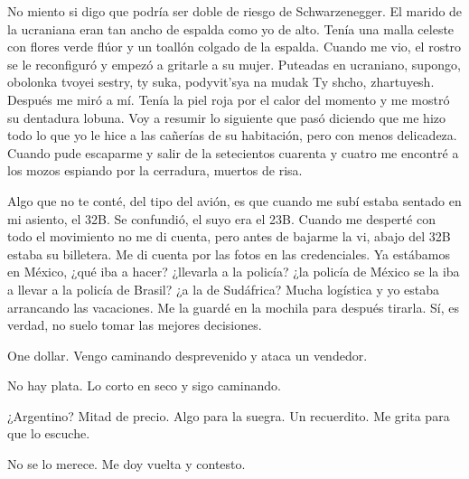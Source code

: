 \documentclass[12pt,twoside,openright,a5paper]{book}
\begin{document}
No miento si digo que podría ser doble de riesgo de Schwarzenegger. El
marido de la ucraniana eran tan ancho de espalda como yo de alto. Tenía
una malla celeste con flores verde flúor y un toallón colgado de la
espalda. Cuando me vio, el rostro se le reconfiguró y empezó a gritarle a
su mujer. Puteadas en ucraniano, supongo, obolonka tvoyei sestry, ty suka,
podyvit'sya na mudak Ty shcho, zhartuyesh. Después me miró a mí. Tenía
la piel roja por el calor del momento y me mostró su dentadura lobuna. Voy
a resumir lo siguiente que pasó diciendo que me hizo todo lo que yo le
hice a las cañerías de su habitación, pero con menos delicadeza. Cuando
pude escaparme y salir de la setecientos cuarenta y cuatro me encontré a
los mozos espiando por la cerradura, muertos de risa.

\vspace{0.5cm}

\hrulefill\hspace{0.2cm} \decofourleft\decofourright \hspace{0.2cm} \hrulefill
\vspace{0.5cm}

Algo que no te conté, del tipo del avión, es que cuando me subí estaba
sentado en mi asiento, el 32B. Se confundió, el suyo era el 23B. Cuando
me desperté con todo el movimiento no me di cuenta, pero antes de bajarme
la vi, abajo del 32B estaba su billetera. Me di cuenta por las fotos en
las credenciales. Ya estábamos en México, ¿qué iba a hacer? ¿llevarla
a la policía? ¿la policía de México se la iba a llevar a la policía
de Brasil? ¿a la de Sudáfrica? Mucha logística y yo estaba arrancando
las vacaciones. Me la guardé en la mochila para después tirarla. Sí,
es verdad, no suelo tomar las mejores decisiones.

\vspace{0.5cm}

\hrulefill\hspace{0.2cm} \decofourleft\decofourright \hspace{0.2cm} \hrulefill
\vspace{0.5cm}

One dollar. Vengo caminando desprevenido y ataca un vendedor.

No hay plata. Lo corto en seco y sigo caminando.

¿Argentino? Mitad de precio. Algo para la suegra. Un recuerdito. Me grita
para que lo escuche.

No se lo merece. Me doy vuelta y contesto.
\end{document}
